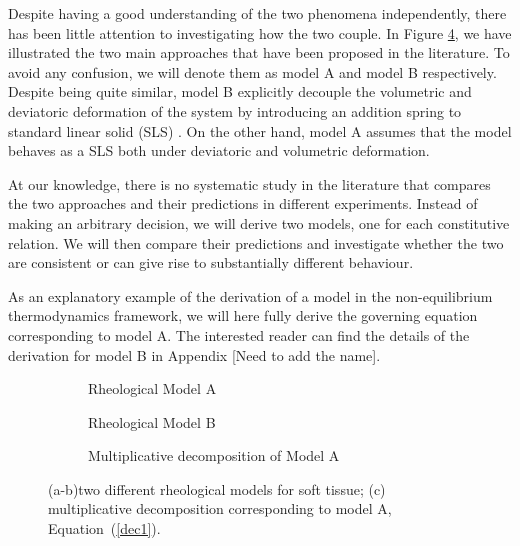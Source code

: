 \documentclass[runningheads]{llncs}
\begin{document}
Despite having a good understanding of the two phenomena independently, there has been little attention to investigating how the two couple. In Figure \ref{figmode}, we have illustrated the two main approaches that have been proposed in the literature. To avoid any confusion, we will denote them as model A and model B respectively. Despite being quite similar, model B explicitly decouple the volumetric and deviatoric deformation of the system by introducing an addition spring to standard linear solid (SLS) \cite{magneto,NGUYEN,Jeru}. On the other hand, model A assumes that the model behaves as a SLS both under deviatoric and volumetric deformation.

At our knowledge, there is no systematic study in the literature that compares the two approaches and their predictions in different experiments. Instead of making an arbitrary decision, we will derive two models, one for each constitutive relation. We will then compare their predictions and investigate whether the two are consistent or can give rise to substantially different behaviour.    

As an explanatory example of the derivation of a model in the non-equilibrium thermodynamics framework, we will here fully derive the governing equation corresponding to model A. The interested reader can find the details of the derivation for model B in Appendix [Need to add the name]. 

\begin{figure}[h!]
	\centering
	\begin{subfigure}{0.32\textwidth}
		\centering
		\Large
	\def\svgwidth{0.95\linewidth}
	
	\caption{Rheological Model A}
	\label{fig1A}
	\end{subfigure}
	\begin{subfigure}{0.32\textwidth}
	\Large
	\def\svgwidth{0.95\linewidth}
	
	\caption{Rheological Model B}
	\label{fig1B}
\end{subfigure}

\begin{subfigure}{0.34\textwidth}
	\Large
	\def\svgwidth{1.75\linewidth}
	
	\caption{Multiplicative decomposition of Model A}
	\label{Model2}
\end{subfigure}
\vspace{5mm}
\caption{(a-b)two different rheological models for soft tissue; (c) multiplicative decomposition corresponding to model A, Equation~(\ref{dec1}).}
\label{figmode}
\end{figure}
\end{document}
